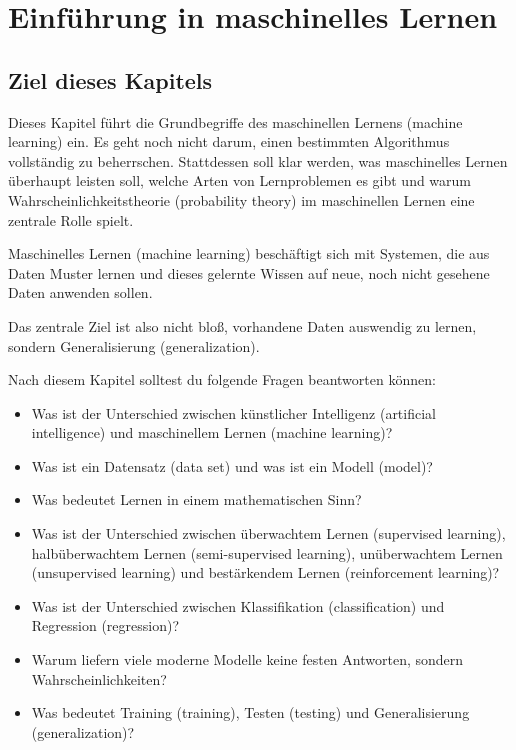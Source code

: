 \chapter{Einführung in maschinelles Lernen}

\section{Ziel dieses Kapitels}

Dieses Kapitel führt die Grundbegriffe des maschinellen Lernens (machine learning) ein.
Es geht noch nicht darum, einen bestimmten Algorithmus vollständig zu beherrschen.
Stattdessen soll klar werden, was maschinelles Lernen überhaupt leisten soll, welche Arten von Lernproblemen es gibt und warum Wahrscheinlichkeitstheorie (probability theory) im maschinellen Lernen eine zentrale Rolle spielt.

\begin{conceptbox}
Maschinelles Lernen (machine learning) beschäftigt sich mit Systemen, die aus Daten Muster lernen und dieses gelernte Wissen auf neue, noch nicht gesehene Daten anwenden sollen.

Das zentrale Ziel ist also nicht bloß, vorhandene Daten auswendig zu lernen, sondern Generalisierung (generalization).
\end{conceptbox}

Nach diesem Kapitel solltest du folgende Fragen beantworten können:

\begin{itemize}
    \item Was ist der Unterschied zwischen künstlicher Intelligenz (artificial intelligence) und maschinellem Lernen (machine learning)?
    \item Was ist ein Datensatz (data set) und was ist ein Modell (model)?
    \item Was bedeutet Lernen in einem mathematischen Sinn?
    \item Was ist der Unterschied zwischen überwachtem Lernen (supervised learning), halbüberwachtem Lernen (semi-supervised learning), unüberwachtem Lernen (unsupervised learning) und bestärkendem Lernen (reinforcement learning)?
    \item Was ist der Unterschied zwischen Klassifikation (classification) und Regression (regression)?
    \item Warum liefern viele moderne Modelle keine festen Antworten, sondern Wahrscheinlichkeiten?
    \item Was bedeutet Training (training), Testen (testing) und Generalisierung (generalization)?
\end{itemize}

